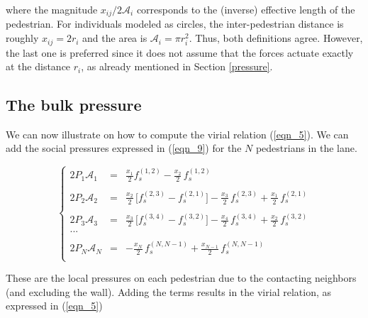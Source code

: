 \vspace{3mm}

\noindent where the magnitude $x_{ij}/2\mathcal{A}_i$ corresponds to the 
(inverse) effective length of the pedestrian. For individuals modeled as 
circles, the inter-pedestrian distance is roughly $x_{ij}=2r_i$ and the area 
is $\mathcal{A}_i=\pi r_i^2$. Thus, both definitions agree. However, the 
last one is preferred since it does not assume that the forces actuate 
exactly at the distance $r_i$, as already mentioned in Section \ref{pressure}. 
\\


\subsection{\label{bulk_pressure}The bulk pressure}

We can now illustrate on how to compute the virial relation (\ref{eqn_5}). We 
can add the social pressures expressed in (\ref{eqn_9}) for the $N$
pedestrians in the lane.


\begin{equation}
\left\{\begin{array}{lcl}
2P_1\mathcal{A}_1 
& = &\displaystyle\frac{x_{1}}{2}f_s^ { (1 , 2)} - 
\displaystyle\frac{x_{2}}{2}\,f_s^ { (1 , 2) }  \\
&& \\
2P_2\mathcal{A}_2 
& = &\displaystyle\frac{x_{2}}{2}\,\big[f_s^ { (2 , 3)} - f_s^{(2,1)} 
\big] - \displaystyle\frac{x_{3}}{2}\,f_s^ { (2 , 3) } +\displaystyle\frac 
{ x_ {1}}{2}\,f_s^{(2,1) 
} \\
&& \\
2P_3\mathcal{A}_3 
& = &\displaystyle\frac{x_{3}}{2}\,\big[f_s^ { (3 , 4)} - f_s^{(3,2)} 
\big] - \displaystyle\frac{x_{4}}{2}\,f_s^ { (3 , 4) } +\displaystyle\frac 
{ x_{2}}{2}\,f_s^{(3,2) 
} \\
... &&\\
&& \\
2P_N\mathcal{A}_N 
& = &-\displaystyle\frac{x_{N}}{2}\, f_s^{(N,N-1)} 
+\displaystyle\frac{ x_{N-1}}{2}\,f_s^{(N,N-1) 
} \\
 \end{array}\right.\label{eqn_11}
\end{equation}

These are the local pressures on each pedestrian due to the 
contacting neighbors (and excluding the wall). Adding the terms results 
in the virial relation, as expressed in (\ref{eqn_5})


